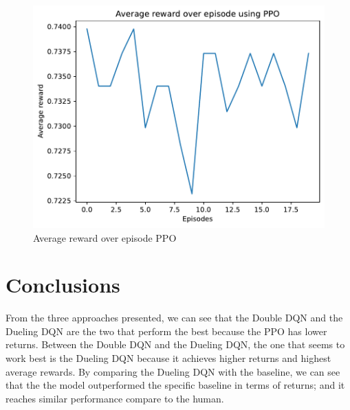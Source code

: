 \documentclass{article}
\begin{document}
\begin{figure}
    \centering
    \includegraphics[width=0.7\linewidth]{img/Average_reward_over_episode_PPO_4000.pdf}
    \caption{Average reward over episode PPO}
    \label{fig:Reward_episode_PPO}
\end{figure}

\section{Conclusions} \label{section:Conclusions}
From the three approaches presented, we can see that the Double DQN and the Dueling DQN are the two that perform the best because the PPO has lower returns. Between the Double DQN and the Dueling DQN, the one that seems to work best is the Dueling DQN because it achieves higher returns and highest average rewards.
By comparing the Dueling DQN with the baseline, we can see that the the model outperformed the specific baseline in terms of returns; and it reaches similar performance compare to the human.



\end{document}
